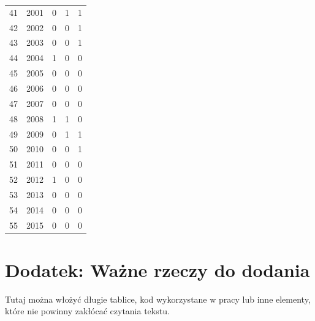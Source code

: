 \documentclass[polish, twoside, 12pt, a4paper]{article}
\theoremstyle{definition}
\theoremstyle{plain}
\theoremstyle{remark}
\begin{document}
\begin{longtable}{rrrrr}
  41    & 2001 & 0      & 1       & 1                                 \\ 
  42    & 2002 & 0      & 0       & 1                                 \\ 
  43    & 2003 & 0      & 0       & 1                                 \\ 
  44    & 2004 & 1      & 0       & 0                                 \\ 
  45    & 2005 & 0      & 0       & 0                                 \\ 
  46    & 2006 & 0      & 0       & 0                                 \\ 
  47    & 2007 & 0      & 0       & 0                                 \\ 
  48    & 2008 & 1      & 1       & 0                                 \\ 
  49    & 2009 & 0      & 1       & 1                                 \\ 
  50    & 2010 & 0      & 0       & 1                                 \\ 
  51    & 2011 & 0      & 0       & 0                                 \\ 
  52    & 2012 & 1      & 0       & 0                                 \\ 
  53    & 2013 & 0      & 0       & 0                                 \\ 
  54    & 2014 & 0      & 0       & 0                                 \\ 
  55    & 2015 & 0      & 0       & 0                                 \\ 
   \hline
\end{longtable}



\appendix

\clearpage
\section{Dodatek: Ważne rzeczy do dodania}

Tutaj można włożyć długie tablice, kod wykorzystane w pracy lub inne elementy, które nie powinny zakłócać czytania tekstu.
\end{document}
